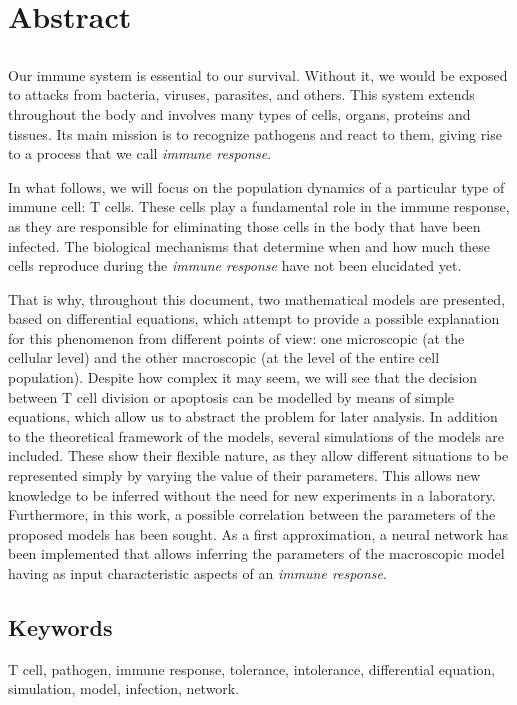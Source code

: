 \chapter*{Abstract}

\section*{}

Our immune system is essential to our survival. Without it, we would be exposed to attacks from bacteria, viruses, parasites, and others. This system extends throughout the body and involves many types of cells, organs, proteins and tissues. Its main mission is to recognize pathogens and react to them, giving rise to a process that we call \textit{immune response}. 


In what follows, we will focus on the population dynamics of a particular type of immune cell: T cells. These cells play a fundamental role in the immune response, as they are responsible for eliminating those cells in the body that have been infected. The biological mechanisms that determine when and how much these cells reproduce during the \textit{immune response} have not been elucidated yet. 

That is why, throughout this document, two mathematical models are presented, based on differential equations, which attempt to provide a possible explanation for this phenomenon from different points of view: one microscopic (at the cellular level) and the other macroscopic (at the level of the entire cell population). Despite how complex it may seem, we will see that the decision between T cell division or apoptosis can be modelled by means of simple equations, which allow us to abstract the problem for later analysis. In addition to the theoretical framework of the models, several simulations of the models are included. These show their flexible nature, as they allow different situations to be represented simply by varying the value of their parameters. This allows new knowledge to be inferred without the need for new experiments in a laboratory. Furthermore, in this work, a possible correlation between the parameters of the proposed models has been sought. As a first approximation, a neural network has been implemented that allows inferring the parameters of the macroscopic model having as input characteristic aspects of an \textit{immune response}.


\section*{Keywords}

\noindent T cell, pathogen, immune response, tolerance, intolerance, differential equation, simulation, model, infection, network.




